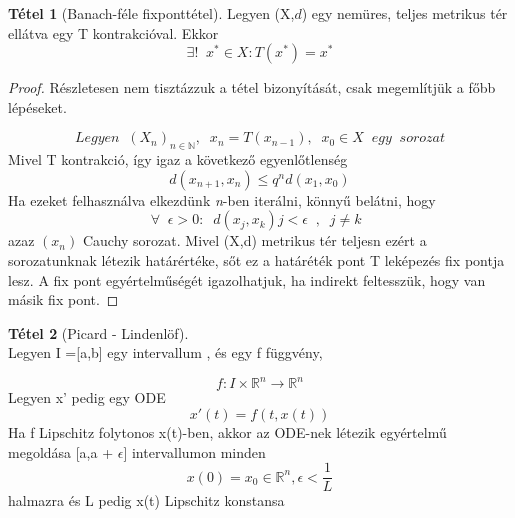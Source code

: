 \documentclass{article}
\theoremstyle{definition}
\theoremstyle{theorem}
\newtheorem{theorem}{Tétel}
\begin{document}
\begin{theorem}[Banach-féle fixponttétel]
Legyen (X,$\textit{d}$) egy nemüres, teljes metrikus tér ellátva egy T kontrakcióval. Ekkor
\begin{equation*}
    \exists!\;\; x^* \in X : T(x^*) = x^*
\end{equation*}
\end{theorem}
\begin{proof}
Részletesen nem tisztázzuk a tétel bizonyítását, csak megemlítjük a főbb lépéseket.

\begin{equation*}
Legyen\;\;(X_n)_{n \in \mathbb{N}},\;\; x_n = T(x_{n-1}), \;\;x_0 \in X \;\;egy \;\; sorozat
\end{equation*}
Mivel T kontrakció, így igaz a következő egyenlőtlenség
\begin{equation*}
    d(x_{n+1},x_n) \leq q^n d(x_1,x_0)
\end{equation*}
Ha ezeket felhasználva elkezdünk \textit{n}-ben iterálni, könnyű belátni, hogy
\begin{equation*}
    \forall \;\; \epsilon >0 : \;\;d(x_j,x_k) j < \epsilon\;\;, \;\;j\neq k  \;\;
\end{equation*}
azaz  $(x_n)$ Cauchy  sorozat.
Mivel (X,d) metrikus tér teljesn ezért a sorozatunknak létezik határértéke, sőt ez a határéték pont T leképezés fix pontja lesz. A fix pont egyértelműségét igazolhatjuk, ha indirekt feltesszük, hogy van másik fix pont.
\end{proof}
\begin{theorem} [Picard - Lindenlöf] \\
Legyen I =[a,b] egy intervallum , és egy f függvény,

\begin{equation*}
f :  I \times \mathbb{R}^n \rightarrow \mathbb{R}^n
\end{equation*}
Legyen x' pedig egy ODE
\[
x'(t) = f(t,x(t))
\]
Ha f Lipschitz folytonos x(t)-ben, akkor az ODE-nek létezik egyértelmű megoldása [a,a + $\epsilon$]
intervallumon minden
\[
x(0) = x_0 \in \mathbb{R}^n, \epsilon < \frac{1}{L}
\] halmazra és L pedig x(t) Lipschitz konstansa
\end{theorem}
\end{document}
